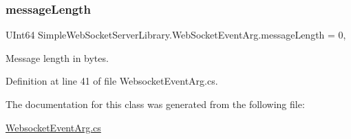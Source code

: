 \subsubsection{\texorpdfstring{message\+Length}{messageLength}}
{\footnotesize\ttfamily U\+Int64 Simple\+Web\+Socket\+Server\+Library.\+Web\+Socket\+Event\+Arg.\+message\+Length = 0\hspace{0.3cm}{\ttfamily [get]}, {\ttfamily [set]}}



Message length in bytes. 



Definition at line 41 of file Websocket\+Event\+Arg.\+cs.



The documentation for this class was generated from the following file\+:\begin{DoxyCompactItemize}
\item 
\mbox{\hyperlink{_websocket_event_arg_8cs}{Websocket\+Event\+Arg.\+cs}}\end{DoxyCompactItemize}
